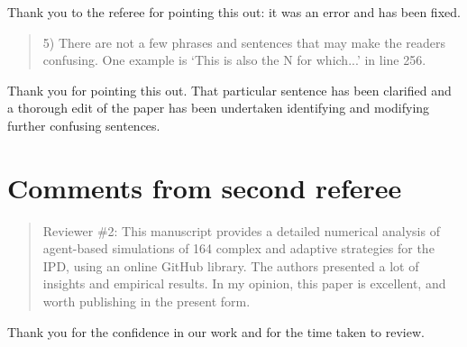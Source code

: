 \documentclass[a4]{article}
\begin{document}
Thank you to the referee for pointing this out: it was an error and has been
fixed.

\begin{quote}
  5) There are not a few phrases and sentences that may make the readers
  confusing. One example is `This is also the N for which...' in line 256.
\end{quote}

Thank you for pointing this out. That particular sentence has been clarified and
a thorough edit of the paper has been undertaken identifying and modifying
further confusing sentences.

\section{Comments from second referee}


\begin{quote}
  Reviewer \#2: This manuscript provides a detailed numerical analysis of
  agent-based simulations of 164 complex and adaptive strategies for the IPD,
  using an online GitHub library. The authors presented a lot of insights and
  empirical results. In my opinion, this paper is excellent, and worth publishing
  in the present form.
\end{quote}

Thank you for the confidence in our work and for the time taken to review.
\end{document}
